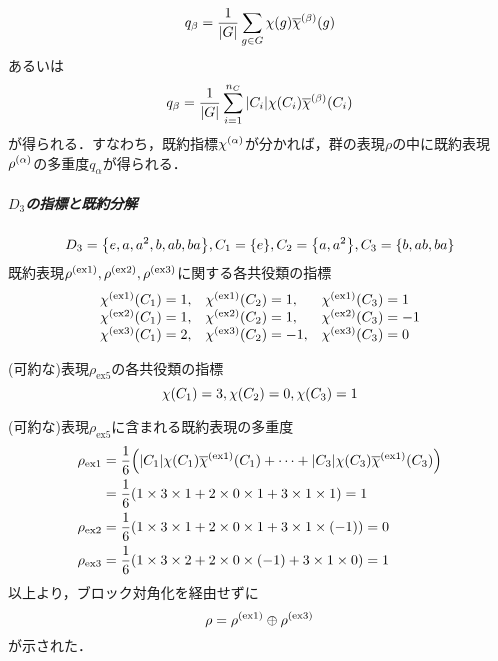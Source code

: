 \documentclass[main]{subfiles}
\begin{document}
		\[q_\beta=\frac{1}{\qty|G|}\sum_{g\in G}\chi\qty(g)\overline{\chi}^\qty(\beta)\qty(g)\]
		あるいは
		\[q_\beta=\frac{1}{\qty|G|}\sum_{i=1}^{n_C}\qty|C_i|\chi\qty(C_i)\overline{\chi}^\qty(\beta)\qty(C_i)\]
		が得られる．すなわち，既約指標$\chi^\qty(\alpha)$が分かれば，群の表現$\rho$の中に既約表現$\rho^\qty(\alpha)$の多重度$q_\alpha$が得られる．
	\subparagraph{$D_3$の指標と既約分解}
		\[D_3=\qty{e,a,a^2,b,ab,ba},C_1=\qty{e},C_2=\qty{a,a^2},C_3=\qty{b,ab,ba}\]
		既約表現$\rho^\qty(\text{ex1}),\rho^\qty(\text{ex2}),\rho^\qty(\text{ex3})$に関する各共役類の指標
		\begin{align*}
			\begin{array}{lll}
				\chi^\qty(\text{ex1})\qty(C_1)=1, & \chi^\qty(\text{ex1})\qty(C_2)=1,  & \chi^\qty(\text{ex1})\qty(C_3)=1  \\
				\chi^\qty(\text{ex2})\qty(C_1)=1, & \chi^\qty(\text{ex2})\qty(C_2)=1,  & \chi^\qty(\text{ex2})\qty(C_3)=-1 \\
				\chi^\qty(\text{ex3})\qty(C_1)=2, & \chi^\qty(\text{ex3})\qty(C_2)=-1, & \chi^\qty(\text{ex3})\qty(C_3)=0
			\end{array}
		\end{align*}

		(可約な)表現$\rho_\text{ex5}$の各共役類の指標
		\[\chi\qty(C_1)=3,\chi\qty(C_2)=0,\chi\qty(C_3)=1\]

		(可約な)表現$\rho_\text{ex5}$に含まれる既約表現の多重度
		\begin{align*}
			\rho_\text{ex1} & =\frac{1}{6}\qty(\qty|C_1|\chi\qty(C_1)\overline{\chi}^\qty(\text{ex1})\qty(C_1)+\cdots+\qty|C_3|\chi\qty(C_3)\overline{\chi}^\qty(\text{ex1})\qty(C_3)) \\
			                & =\frac{1}{6}\qty(1\times 3\times 1+2\times 0\times 1+3\times 1\times 1)=1                                                                                \\
			\rho_\text{ex2} & =\frac{1}{6}\qty(1\times 3\times 1+2\times 0\times 1+3\times 1\times\qty(-1))=0                                                                          \\
			\rho_\text{ex3} & =\frac{1}{6}\qty(1\times 3\times 2+2\times 0\times\qty(-1)+3\times 1\times 0)=1                                                                          \\
		\end{align*}
		以上より，ブロック対角化を経由せずに
		\[\rho=\rho^\qty(\text{ex1})\oplus\rho^\qty(\text{ex3})\]
		が示された．
\end{document}
